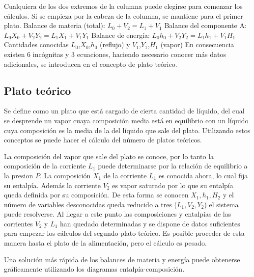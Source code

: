 \documentclass[11pt,openany]{book}
\begin{document}
Cualquiera de los dos extremos de la columna puede elegirse para comenzar los cálculos. Si se 
empieza por la cabeza de la columna, se mantiene para el primer plato.
\newline
Balance de materia (total): $L_0+V_2=L_1+V_1$
\newline \newline
Balance del componente A: $L_0 X_0 + V_2 Y_2 = L_1 X_1 + V_1 Y_1$
\newline \newline
Balance de energía: $L_0 h_0+V_2 Y_2=L_1 h_1+V_1 H_1$
\newline\newline
Cantidades conocidas $L_0$,$X_0$,$h_0$ (reflujo) y $V_1$,$Y_1$,$ H_1$ (vapor)
\newline\newline
En consecuencia existen 6 incógnitas y 3 ecuaciones, haciendo necesario conocer más datos 
adicionales, se introducen en el concepto de plato teórico.
\subsection{Plato teórico}
Se define como un plato que está cargado de cierta cantidad de líquido, del cual se desprende 
un vapor cuaya composición media está en equilibrio con un líquido cuya composición es la media de 
la del líquido que sale del plato. Utilizando estos conceptos se puede hacer el cálculo del número de 
platos teóricos.

La composición del vapor que sale del plato se conoce, por lo tanto la composición de la corriente 
$L_1$ puede determinarse por la relación de equilibrio a la presion $P$. La composición $X_1$ de la corriente 
$L_1$ es conocida ahora, lo cual fija su entalpía. Además la corriente $V_2$ es vapor saturado por lo que 
su entalpía queda definida por su composición. De esta forma se conocen $X_1, h_1, H_2$ y el número 
de variables desconocidas queda reducido a tres ($L_1,V_2,Y_2$) el sistema puede resolverse. Al llegar a
este punto las composiciones y entalpías de las corrientes $V_2$ y $L_1$ han quedado determinadas y se 
dispone de datos suficientes para empezar los cálculos del segundo plato teórico. Es posible 
proceder de esta manera hasta el plato de la alimentación, pero el cálculo es pesado.

Una solución más rápida de los balances de materia y energía puede obtenerse gráficamente 
utilizando los diagramas entalpía-composición.
\end{document}
